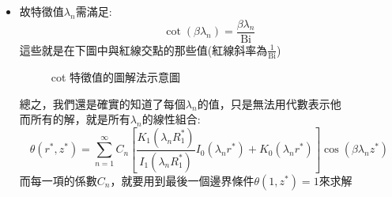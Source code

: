 \documentclass[../main.tex]{subfiles}
\begin{document}
\begin{itemize}
\begin{itemize}
\begin{align}
        \right] \nonumber\\
        &\quad\quad + \text{Bi} \cdot C_5 \cos(\beta \lambda)\left[
          \frac{K_1(\lambda R_1^\ast)}{I_1(\lambda R_1^\ast)} I_0(\lambda r^\ast) + K_0(\lambda r^\ast)
        \right] =0 \nonumber\\
        \Rightarrow\quad & C_5 \left[
          \frac{K_1(\lambda R_1^\ast)}{I_1(\lambda R_1^\ast)} I_0(\lambda r^\ast) + K_0(\lambda r^\ast)
        \right] \left(-\beta \lambda\sin(\beta \lambda) + \text{Bi} \cdot \cos(\beta \lambda)\right) = 0
      \end{align}
      因為要對所有$r^\ast$成立，故:
      \begin{equation}
        -\beta \lambda\sin(\beta \lambda) + \text{Bi} \cdot \cos(\beta \lambda) = 0
      \end{equation}
      \item 故特徵值$\lambda_n$需滿足:
      \begin{equation}
        \cot(\beta \lambda_n) = \frac{\beta\lambda_n}{\text{Bi}}
      \end{equation}
      這些就是在下圖中與紅線交點的那些值(紅線斜率為$\frac{1}{\text{Bi}}$)
      \begin{figure}[H]
        \centering
        \caption{cot 特徵值的圖解法示意圖}
      \end{figure}
      總之，我們還是確實的知道了每個$\lambda_n$的值，只是無法用代數表示他\\
      而所有的解，就是所有$\lambda_n$的線性組合:
      \begin{equation}
        \theta(r^\ast, z^\ast) = \sum_{n=1}^\infty C_n \left[
          \frac{K_1(\lambda_n R_1^\ast)}{I_1(\lambda_n R_1^\ast)} I_0(\lambda_n r^\ast) + K_0(\lambda_n r^\ast)
        \right] \cos(\beta \lambda_n z^\ast)
      \end{equation}
      而每一項的係數$C_n$，就要用到最後一個邊界條件$\theta(1, z^\ast) = 1$來求解

\end{itemize}
\end{itemize}
\end{document}
